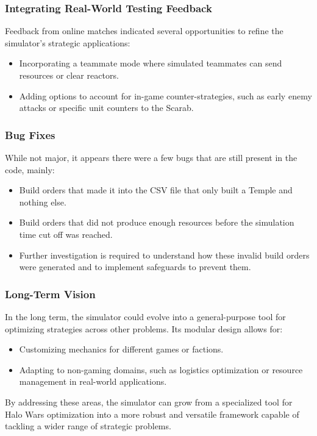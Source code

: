 \documentclass[a4paper, 12pt, english]{article}
\begin{document}
\subsubsection{Integrating Real-World Testing Feedback}
Feedback from online matches indicated several opportunities to refine the simulator’s strategic applications:
    \begin{itemize}
    \item Incorporating a teammate mode where simulated teammates can send resources or clear reactors.
    \item Adding options to account for in-game counter-strategies, such as early enemy attacks or specific unit counters to the Scarab.
    \end{itemize}


\subsubsection{Bug Fixes}
While not major, it appears there were a few bugs that are still present in the code, mainly:
    \begin{itemize}
    \item Build orders that made it into the CSV file that only built a Temple and nothing else.
    \item Build orders that did not produce enough resources before the simulation time cut off was reached.
    \item Further investigation is required to understand how these invalid build orders were generated and to implement safeguards to prevent them.
    \end{itemize}

\subsubsection{Long-Term Vision}
In the long term, the simulator could evolve into a general-purpose tool for optimizing strategies across other problems. Its modular design allows for:
        \begin{itemize}
    \item Customizing mechanics for different games or factions.
    \item Adapting to non-gaming domains, such as logistics optimization or resource management in real-world applications.
    \end{itemize}


By addressing these areas, the simulator can grow from a specialized tool for Halo Wars optimization into a more robust and versatile framework capable of tackling a wider range of strategic problems.
\newline
\end{document}
